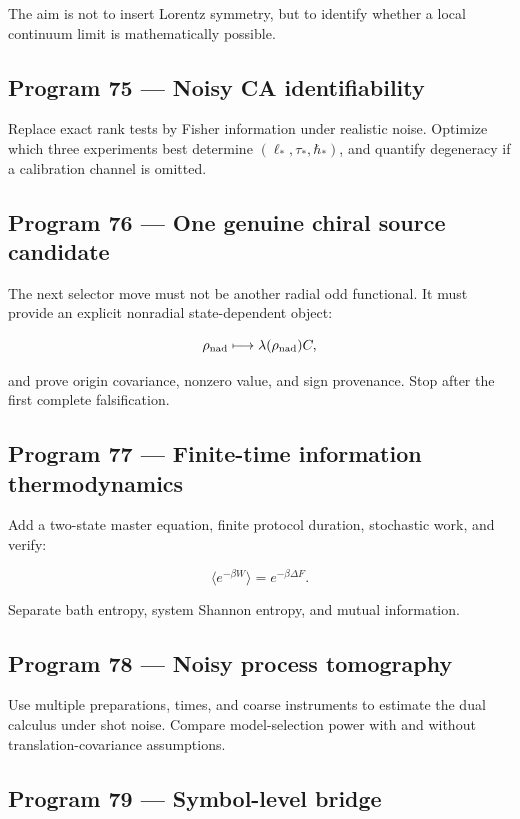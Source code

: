 \documentclass[11pt,a4paper,openany]{report}
\begin{document}
The aim is not to insert Lorentz symmetry, but to identify whether a local continuum limit is mathematically possible.

\subsection{Program 75 — Noisy CA identifiability}

Replace exact rank tests by Fisher information under realistic noise. Optimize which three experiments best determine \((\ell_*,\tau_*,\hbar_*)\), and quantify degeneracy if a calibration channel is omitted.

\subsection{Program 76 — One genuine chiral source candidate}

The next selector move must not be another radial odd functional. It must provide an explicit nonradial state-dependent object:

\[
\rho_{\rm nad}\longmapsto \lambda(\rho_{\rm nad})C,
\]

and prove origin covariance, nonzero value, and sign provenance. Stop after the first complete falsification.

\subsection{Program 77 — Finite-time information thermodynamics}

Add a two-state master equation, finite protocol duration, stochastic work, and verify:

\[
\langle e^{-\beta W}\rangle=e^{-\beta\Delta F}.
\]

Separate bath entropy, system Shannon entropy, and mutual information.

\subsection{Program 78 — Noisy process tomography}

Use multiple preparations, times, and coarse instruments to estimate the dual calculus under shot noise. Compare model-selection power with and without translation-covariance assumptions.

\subsection{Program 79 — Symbol-level bridge}
\end{document}
